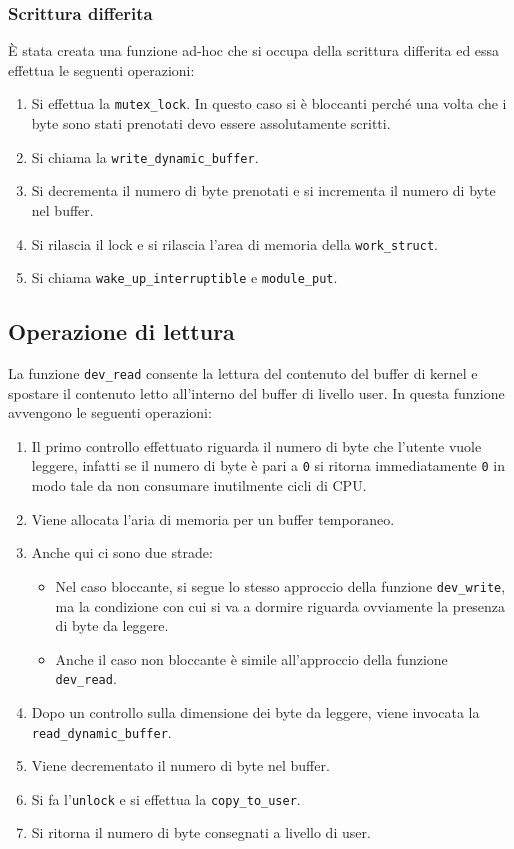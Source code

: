 \documentclass[oneside]{article}
\begin{document}
\subsubsection{Scrittura differita}
È stata creata una funzione ad-hoc che si occupa della scrittura differita ed essa effettua le seguenti operazioni:
\begin{enumerate}
\item Si effettua la \texttt{mutex\_lock}. In questo caso si è bloccanti perché una volta che i byte sono stati prenotati devo essere assolutamente scritti.
\item Si chiama la \texttt{write\_dynamic\_buffer}.
\item Si decrementa il numero di byte prenotati e si incrementa il numero di byte nel buffer.
\item Si rilascia il lock e si rilascia l'area di memoria della \texttt{work\_struct}.
\item Si chiama \texttt{wake\_up\_interruptible} e \texttt{module\_put}.
\end{enumerate}

\subsection{Operazione di lettura}
La funzione \texttt{dev\_read} consente la lettura del contenuto del buffer di kernel e spostare il contenuto letto all'interno del buffer di livello user. In questa funzione avvengono le seguenti operazioni:
\begin{enumerate}
\item Il primo controllo effettuato riguarda il numero di byte che l'utente vuole leggere, infatti se il numero di byte è pari a \texttt{0} si ritorna immediatamente \texttt{0} in modo tale da non consumare inutilmente cicli di CPU.
\item Viene allocata l'aria di memoria per un buffer temporaneo.
\item Anche qui ci sono due strade:
\begin{itemize}
\item Nel caso bloccante, si segue lo stesso approccio della funzione \texttt{dev\_write}, ma la condizione con cui si va a dormire riguarda ovviamente la presenza di byte da leggere.
\item Anche il caso non bloccante è simile all'approccio della funzione \texttt{dev\_read}.
\end{itemize}
\item Dopo un controllo sulla dimensione dei byte da leggere, viene invocata la \texttt{read\_dynamic\_buffer}.
\item Viene decrementato il numero di byte nel buffer.
\item Si fa l'\texttt{unlock} e si effettua la \texttt{copy\_to\_user}.
\item Si ritorna il numero di byte consegnati a livello di user.
\end{enumerate}
\end{document}
